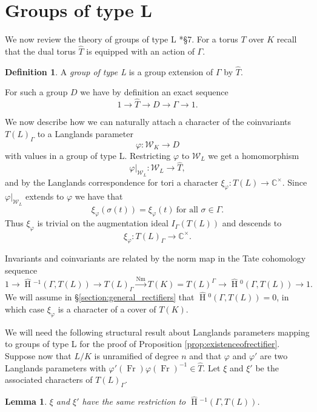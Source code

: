 \documentclass{amsart}
\theoremstyle{plain}
\newtheorem{lemma}[theorem]{Lemma}
\newcommand{\HT}[1]{\hat{\HH}{}^{#1}}
\theoremstyle{definition}
\newtheorem{definition}[theorem]{Definition}
\numberwithin{equation}{section}
\DeclareMathOperator{\HH}{H}
\DeclareMathOperator{\Nm}{Nm}
\DeclareMathOperator{\Fr}{Fr}
\newcommand{\CCx}{\mathbb{C}^\times}
\newcommand{\Weil}{\mathcal{W}}
\begin{document}
\section{Groups of type L} \label{section:groups_of_type_L}

We now review the theory of groups of type L \cite{roe:13a}*{\S 7}.
For a torus $T$ over $K$ recall that the dual torus $\hat{T}$ is equipped with
an action of $\Gamma$.

\begin{definition}
A \emph{group of type L} is a group extension of $\Gamma$ by $\hat{T}$.
\end{definition}

For such a group $D$ we have by definition an exact sequence
$$1 \rightarrow \hat{T} \rightarrow D \rightarrow \Gamma \rightarrow 1.$$

We now describe how we can naturally attach a character of the coinvariants
$T(L)_{\Gamma}$ to a Langlands parameter
$$\varphi : \Weil_K \rightarrow D$$
with values in a group of type L.
Restricting $\varphi$ to $\Weil_L$ we get a homomorphism
$$\varphi|_{\Weil_L} : \Weil_L \rightarrow \hat{T},$$
and by the Langlands correspondence for tori a character
$\xi_{\varphi} : T(L) \rightarrow \CCx$.  Since $\varphi|_{\Weil_L}$ extends
to $\varphi$ we have that
$$\xi_{\varphi}(\sigma(t)) = \xi_{\varphi}(t)\ \mbox{for all $\sigma \in \Gamma$.}$$
Thus $\xi_{\varphi}$ is trivial on the augmentation ideal $I_{\Gamma}(T(L))$
and descends to $$\xi_{\varphi} : T(L)_\Gamma \rightarrow \CCx.$$

Invariants
and coinvariants are related by the norm map
in the Tate cohomology sequence
$$1 \rightarrow \HT{-1}(\Gamma,T(L)) \rightarrow T(L)_{\Gamma} \xrightarrow{\Nm} T(K)
  = T(L)^{\Gamma} \rightarrow \HT{0}(\Gamma,T(L)) \rightarrow 1.$$
We will assume in \S \ref{section:general_rectifiers} that $\HT{0}(\Gamma,T(L)) = 0$, in which case
$\xi_\varphi$ is a character of a cover of $T(K)$.

We will need the following structural result about Langlands
parameters mapping to groups of type L for the proof of
Proposition \ref{prop:existenceofrectifier}.  Suppose now that $L/K$ is unramified of degree $n$ and that
$\varphi$ and $\varphi'$ are two Langlands parameters
with $\varphi'(\Fr) \varphi(\Fr)^{-1} \in \hat{T}$.
Let $\xi$ and $\xi'$ be the associated characters of $T(L)_{\Gamma}$.

\begin{lemma} \label{lem:toral_modification}
$\xi$ and $\xi'$ have the same restriction to $\HT{-1}(\Gamma, T(L))$.
\end{lemma}
\end{document}
